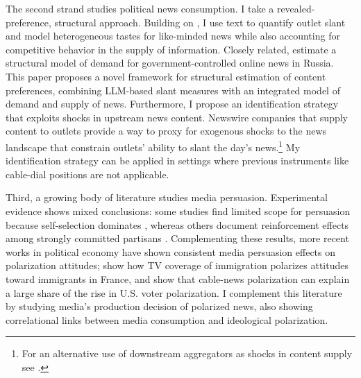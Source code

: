 \documentclass[12pt]{article}
\begin{document}
The second strand studies political news consumption. I take a revealed-preference, structural approach. Building on \citet{gentzkow2010media}, I use text to quantify outlet slant and model heterogeneous tastes for like-minded news while also accounting for competitive behavior in the supply of information. Closely related, \citet{SimonovRao2022} estimate a structural model of demand for government-controlled online news in Russia. This paper proposes a novel framework for structural estimation of content preferences, combining LLM-based slant measures with an integrated model of demand and supply of news. Furthermore, I propose an identification strategy that exploits shocks in upstream news content. Newswire companies that supply content to outlets provide a way to proxy for exogenous shocks to the news landscape that constrain outlets’ ability to slant the day’s news.\footnote{For an alternative use of downstream aggregators as shocks in content supply see \cite{milena}.} My identification strategy can be applied in settings where previous instruments like cable-dial positions \citep{martin2017} are not applicable. 



Third, a growing body of literature studies media persuasion. Experimental evidence shows mixed conclusions: some studies find limited scope for persuasion because self-selection dominates \citep{arceneaux_johnson_2013}, whereas others document reinforcement effects among strongly committed partisans \citep{levendusky}. Complementing these results, more recent works in political economy  have shown consistent media persuasion effects on polarization attitudes; \citet{schneider2025media} show how TV coverage of immigration polarizes attitudes toward immigrants in France, and \citet{martin2017} show that cable-news polarization can explain a large share of the rise in U.S. voter polarization. I complement this literature by studying media's production decision of polarized news, also showing correlational links between media consumption and ideological polarization.


\end{document}
